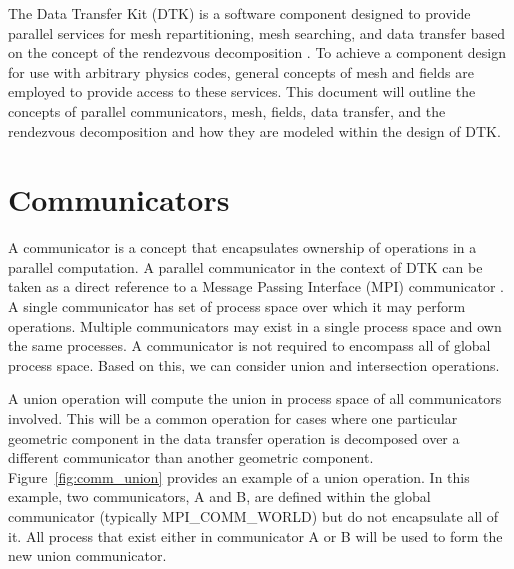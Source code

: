\documentclass[letterpaper,12pt]{article}
\begin{document}
The Data Transfer Kit (DTK) is a software component designed to
provide parallel services for mesh repartitioning, mesh searching, and
data transfer based on the concept of the rendezvous decomposition
\cite{Plimpton_2004}. To achieve a component design for use with
arbitrary physics codes, general concepts of mesh and fields are
employed to provide access to these services. This document will
outline the concepts of parallel communicators, mesh, fields, data
transfer, and the rendezvous decomposition and how they are modeled
within the design of DTK.

\clearpage

\section{Communicators}\label{sec:communicators}
A communicator is a concept that encapsulates ownership of operations
in a parallel computation. A parallel communicator in the context of
DTK can be taken as a direct reference to a Message Passing Interface
(MPI) communicator \cite{MPI_1994}. A single communicator has set of
process space over which it may perform operations. Multiple
communicators may exist in a single process space and own the same
processes. A communicator is not required to encompass all of global
process space. Based on this, we can consider union and intersection
operations.

A union operation will compute the union in process space of all
communicators involved. This will be a common operation for cases
where one particular geometric component in the data transfer
operation is decomposed over a different communicator than another
geometric component. Figure~\ref{fig:comm_union} provides an
example of a union operation. In this example, two communicators, A
and B, are defined within the global communicator (typically
MPI\_COMM\_WORLD) but do not encapsulate all of it. All process
that exist either in communicator A or B will be used to form the
new union communicator.
\end{document}
